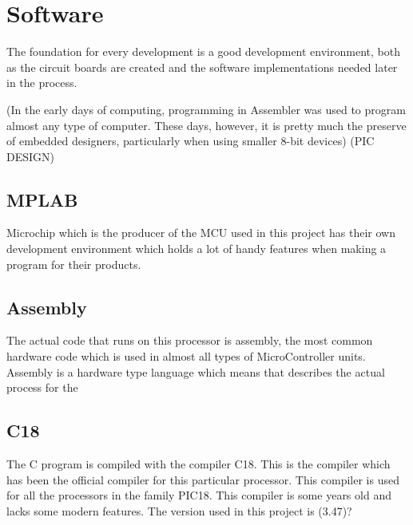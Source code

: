 \section{Software}
The foundation for every development is a good development environment, both as the circuit boards are created and the software implementations needed later in the process.

(In the early days of computing, programming in Assembler was used to program almost any type of
computer. These days, however, it is pretty much the preserve of embedded designers, particularly when
using smaller 8-bit devices) (PIC DESIGN)

\subsection{MPLAB}
Microchip which is the producer of the MCU used in this project has their own development environment which holds a lot of handy features when making a program for their products. 



\subsection{Assembly}
The actual code that runs on this processor is assembly, the most common hardware code which is used in almost all types of MicroController units. Assembly is a hardware type language which means that describes the actual process for the 

\subsection{C18}
The C program is compiled with the compiler C18. This is the compiler which has been the official compiler for this particular processor. This compiler is used for all the processors in the family PIC18. This compiler is some years old and lacks some modern features. The version used in this project is (3.47)?